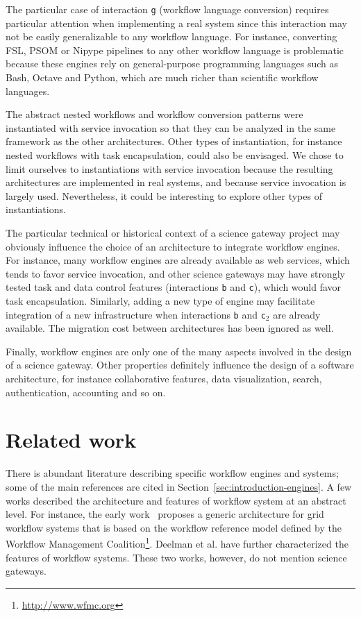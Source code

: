 \documentclass[preprint,3p,twocolumn]{elsarticle}
\begin{document}
The particular case of interaction \texttt{g} (workflow language
conversion) requires particular attention when implementing a real
system since this interaction may not be easily generalizable to any
workflow language. For instance, converting FSL, PSOM or Nipype
pipelines to any other workflow language is problematic because these
engines rely on general-purpose programming languages such as Bash,
Octave and Python, which are much richer than scientific workflow
languages.

The abstract nested workflows and workflow conversion patterns were
instantiated with service invocation so that they can be analyzed in
the same framework as the other architectures. Other types of
instantiation, for instance nested workflows with task encapsulation,
could also be envisaged. We chose to limit ourselves to instantiations
with service invocation because the resulting architectures are
implemented in real systems, and because service invocation is largely
used. Nevertheless, it could be interesting to explore other types of
instantiations.

The particular technical or historical context of a science gateway
project may obviously influence the choice of an architecture to
integrate workflow engines. For instance, many workflow engines are
already available as web services, which tends to favor service
invocation, and other science gateways may have strongly tested task
and data control features (interactions \texttt{b} and \texttt{c}),
which would favor task encapsulation. Similarly, adding a new type of engine
may facilitate integration of a new infrastructure when interactions
\texttt{b} and \texttt{c$_2$} are already available. The migration
cost between architectures has been ignored as well.

Finally, workflow engines are only one of the many aspects involved in
the design of a science gateway. Other properties definitely influence
the design of a software architecture, for instance collaborative
features, data visualization, search, authentication, accounting and
so on.

\section{Related work}
\label{sec:related}
 
There is abundant literature describing specific workflow engines and
systems; some of the main references are cited in
Section~\ref{sec:introduction-engines}. A few works described the
architecture and features of workflow system at an abstract level. For
instance, the early work~\cite{yuTaxonomy} proposes a generic
architecture for grid workflow systems that is based on the workflow
reference model defined by the Workflow Management
Coalition\footnote{\url{http://www.wfmc.org}}.  Deelman et
al. \cite{deelman2009workflows} have further characterized the
features of workflow systems. These two works, however, do not mention
science gateways.
\end{document}
